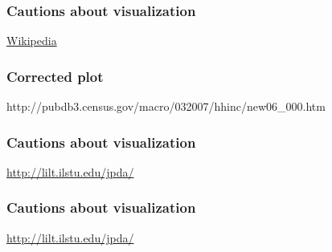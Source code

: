 \documentclass[handout]{beamer}
\begin{document}
   \begin{frame} \frametitle{Cautions about visualization}

   \begin{figure}
   \centering
   \end{figure}

   \href{http://en.wikipedia.org/wiki/Household_income_in_the_United_States}{Wikipedia}
   \end{frame}



   \begin{frame}
   \frametitle{Corrected plot}
   \begin{center}
   \end{center}
   http://pubdb3.census.gov/macro/032007/hhinc/new06_000.htm
   \end{frame}


   \begin{frame} \frametitle{Cautions about visualization}

   \begin{figure}
   \centering
   \end{figure}

   \href{http://lilt.ilstu.edu/jpda/}{http://lilt.ilstu.edu/jpda/}
   \end{frame}


   \begin{frame} \frametitle{Cautions about visualization}

   \begin{figure}
   \centering
   \end{figure}

   \href{http://lilt.ilstu.edu/jpda/}{http://lilt.ilstu.edu/jpda/}
   \end{frame}
\end{document}
